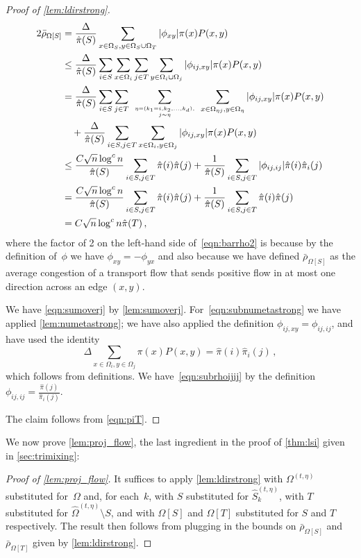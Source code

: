 \documentclass[a4paper, 12p]{article}
\numberwithin{equation}{section}
\newcommand{\Omorproj}{\hat{\Omega}}
\newcommand{\piorproj}{\hat{\pi}}
\begin{document}
\begin{proof}[Proof of \cref{lem:ldirstrong}]
\begin{align}
    2\bar\rho_{\Omega[S]} &= \frac{\Delta}{\piorproj(S)}\sum_{x \in \Omega_S, y \in \Omega_S \cup \Omega_T}  |\phi_{xy}| \pi(x)P(x, y) \label{eqn:barrho2}  \\
    &\leq \frac{\Delta}{\piorproj(S)}\sum_{i \in S}\sum_{x \in \Omega_i}\sum_{j \in T}\sum_{y \in \Omega_i \cup \Omega_j}|\phi_{ij,xy}|\pi(x)P(x, y)  \nonumber \\
    &= \frac{\Delta}{\piorproj(S)}\sum_{i \in S}\sum_{j \in T}~\sum_{\eta = (k_1 = i, k_2, \dots, k_d),\atop j \sim \eta}~\sum_{x \in \Omega_{\eta j}, y \in \Omega_{\eta}} |\phi_{ij,xy}| \pi(x)P(x, y) \nonumber \\
    &\quad + \frac{\Delta}{\piorproj(S)}\sum_{i \in S, j \in T}\sum_{x \in \Omega_i, y \in \Omega_j}|\phi_{ij,xy}|\pi(x)P(x, y)  \label{eqn:sumoverj}  \\
    &\leq \frac{C \sqrt n \log^{c} n}{\piorproj(S)}\sum_{i \in S, j \in T}\piorproj(i)\piorproj(j) + \frac{1}{\piorproj(S)}\sum_{i\in S, j \in T}|\phi_{ij,ij}|\piorproj(i)\piorproj_i(j) \label{eqn:subnumetastrong} \\
    &=  \frac{C \sqrt n \log^{c} n}{\piorproj(S)}\sum_{i \in S, j \in T}\piorproj(i)\piorproj(j) + \frac{1}{\piorproj(S)}\sum_{i\in S, j \in T}\piorproj(i)\piorproj(j) \label{eqn:subrhoijij}\\
    &= C \sqrt n \log^c n \piorproj(T)\,,\label{eqn:piT}
\end{align}
where the factor of 2 on the left-hand side of~\eqref{eqn:barrho2} is because by the definition of~$\phi$ we have $\phi_{xy} = -\phi_{yx}$ and also because we have defined $\bar\rho_{\Omega[S]}$ as the average congestion of a transport flow that sends positive flow in at most one direction across an edge $(x, y)$.


We have \eqref{eqn:sumoverj} by \cref{lem:sumoverj}. For~\eqref{eqn:subnumetastrong} we have applied \cref{lem:numetastrong}; we have also applied the definition $\phi_{ij,xy} = \phi_{ij,ij}$, and have used the identity
\[
    \Delta\sum_{x \in \Omega_i, y \in \Omega_j}\pi(x)P(x,y) = \piorproj(i)\piorproj_i(j)\,,
\]
which follows from definitions. We have~\eqref{eqn:subrhoijij} by the definition $\phi_{ij,ij} = \frac{\piorproj(j)}{\piorproj_i(j)}$.  

The claim follows from \eqref{eqn:piT}. 
\end{proof}

We now prove \cref{lem:proj_flow}, the last ingredient in the proof of \cref{thm:lsi} given in \cref{sec:trimixing}: 
\begin{proof}[Proof of \cref{lem:proj_flow}]
It suffices to apply \cref{lem:ldirstrong} with $\Omega^{(t,\eta)}$ substituted for~$\Omega$ and, for each~$k$, with $S$ substituted for $\hat S_k^{(t,\eta)}$, with $T$ substituted for $\Omorproj^{(t,\eta)} \setminus S$, and with $\Omega[S]$ and $\Omega[T]$ substituted for $S$ and $T$ respectively. The result then follows from plugging in the bounds on $\bar \rho_{\Omega[S]}$ and $\bar \rho_{\Omega[T]}$ given by \cref{lem:ldirstrong}.
\end{proof}
\end{document}
